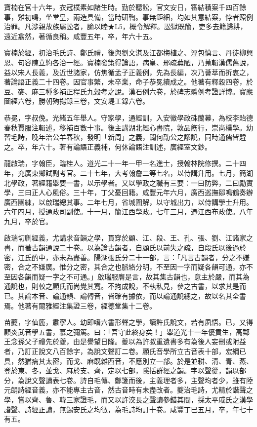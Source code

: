 \begin{pinyinscope}
寶楠在官十六年，衣冠樸素如諸生時。勤於聽訟，官文安日，審結積案千四百餘事，雞初鳴，坐堂皇，兩造具備，當時研鞫。事無鉅細，均如其意結案，悖者照例治罪。凡涉親故族屬訟者，諭以睦★L5，概令解釋。訟獄既簡，吏多去籍歸耕，遠近翕然，著循良稱。咸豐五年，卒，年六十五。

寶楠於經，初治毛氏詩、鄭氏禮，後與劉文淇及江都梅植之、涇包慎言、丹徒柳興恩、句容陳立約各治一經。寶楠發策得論語，病皇、邢疏蕪陋，乃蒐輯漢儒舊說，益以宋人長義，及近世諸家，仿焦循孟子正義例，先為長編，次乃薈萃而折衷之，著論語正義二十四卷。因官事繁，未卒業，命子恭冕續成之。他著有釋穀四卷，於豆、麥、麻三種多補正程氏九穀考之說。漢石例六卷，於碑志體例考證詳博。寶應圖經六卷，勝朝殉揚錄三卷，文安堤工錄六卷。

恭冕，字叔俛。光緒五年舉人。守家學，通經訓，入安徽學政硃蘭幕，為校李貽德春秋賈服注輯述，移補百數十事。後主講湖北經心書院，敦品飭行，崇尚樸學。幼習毛詩，晚年治公羊春秋，發明「新周」之義，闢何劭公之謬說，同時通儒皆韙之。卒，年六十。著有論語正義補，何休論語注訓述，廣經室文鈔。

龍啟瑞，字翰臣，臨桂人。道光二十一年一甲一名進士，授翰林院修撰。二十四年，充廣東鄉試副考官。二十七年，大考翰詹二等七名，以侍講升用。七月，簡湖北學政，著經籍舉要一書，以示學者。又以學政之職有三要：一曰防弊，二曰勵實學，三曰正人心風俗。三十年，丁父憂回籍。咸豐元年六月，廣西巡撫鄒鳴鶴奏辦廣西團練，以啟瑞總其事。二年七月，省城圍解，以守城出力，以侍講學士升用。六年四月，授通政司副使。十一月，簡江西學政。七年三月，遷江西布政使。八年九月，卒於官。

啟瑞切劘經義，尤講求音韻之學，貫穿於顧、江、段、王、孔、張、劉、江諸家之書，而著古韻通說二十卷。以為論古韻者，自顧氏以前失之疏，自段氏以後過於密，江氏酌中，亦未為盡善。陽湖張氏分二十一部，言：「凡言古韻者，分之不嫌密，合之不嫌廣。惟分之密，其合之也脈絡分明，不至因一字而疑各韻可通，亦不至因各韻而疑一字之不可通。」啟瑞服膺是言，故其集古韻也，意主於嚴，而其為通說也，則較之顧氏而尚覺其寬。不拘成說，不執私見，參之古書，以求其是而已。其論本音、論通韻、論轉音，皆確有據依，而以論通說總之，故以名其全書焉。他著有爾雅經注集證三卷，經德堂集十二卷。

苗夔，字仙簏，肅寧人。幼即嗜六書形聲之學，讀許氏說文，若有夙悟。已，又得顧炎武音學五書，慕之彌篤。曰：「吾守此終身矣！」舉道光十一年優貢生，高郵王念孫父子禮先於夔，由是譽望日隆。夔以為許叔重遺書多有為後人妄刪或附益者，乃訂正說文八百餘字，為說文聲訂二卷。顧氏音學所立古音表十部，宏綱已具，然猶病其太密，而戈、麻既雜西音，不應別立一部。於是並耕、清、青、蒸、登於東、冬，並戈、麻於支、齊，定以七部，隱括群經之韻。字以聲從，韻以部分，為說文聲讀表七卷。詩自毛傳、鄭箋而後，主義理者多，主聲均者少，雖有陸元朗詩經音義，亦不能專主古音，然古音時有未盡改者。夔治毛詩，尤精於諧聲之學，嘗以齊、魯、韓三家證毛，而又以許洨長之聲讀參錯其間，採太平戚氏之漢學諧聲、詩經正讀，無錫安氏之均徵，為毛詩均訂十卷。咸豐丁巳五月，卒，年七十有五。


\end{pinyinscope}
